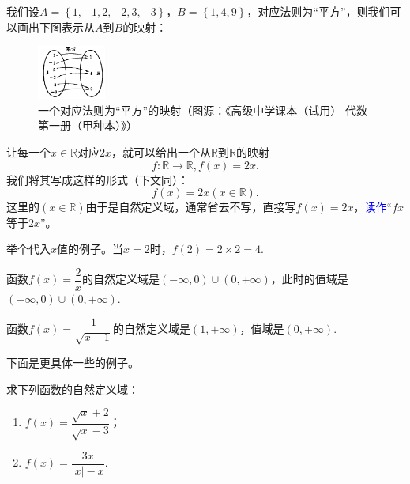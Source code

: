 \documentclass[lang=cn,math=cm,chinesefont=nofont,11pt,scheme=chinese,onecol]{elegantbook}
\begin{document}
\begin{example}
  我们设$A=\left\{1,-1,2,-2,3,-3\right\}$，$B=\left\{1,4,9\right\}$，对应法则为“平方”，则我们可以画出下图表示从$A$到$B$的映射：
\end{example}

\begin{figure}[h]
  \centering
  \includegraphics[width=0.2\textwidth]{image/map2.1.1.png}
  \caption{一个对应法则为“平方”的映射（图源：《高级中学课本（试用） 代数 第一册（甲种本）》）}
  \label{img:map1}
\end{figure}

\begin{example}\label{MapExample2}
  让每一个$x\in\mathbb{R}$对应$2x$，就可以给出一个从$\mathbb{R}$到$\mathbb{R}$的映射$$f:\mathbb{R}\rightarrow\mathbb{R},f(x)=2x.$$我们将其写成这样的形式（下文同）：$$f(x)=2x(x\in\mathbb{R}).$$这里的$(x\in\mathbb{R})$由于是自然定义域，通常省去不写，直接写$f(x)=2x$，\textcolor{blue}{读作}“$fx$等于$2x$”。

  举个代入$x$值的例子。当$x=2$时，$f(2)=2\times 2=4$.
\end{example}

\begin{spacing}{2.0}
  \begin{example}
    函数$f(x)=\dfrac{2}{x}$的自然定义域是$(-\infty,0)\cup(0,+\infty)$，此时的值域是$(-\infty,0)\cup(0,+\infty)$.
  \end{example}
  
  \begin{example}
    函数$f(x)=\dfrac{1}{\sqrt{x-1}}$的自然定义域是$(1,+\infty)$，值域是$(0,+\infty)$.
  \end{example}
  
  下面是更具体一些的例子。
  
  \begin{example}
    求下列函数的自然定义域：
  \end{example}
  
  \begin{enumerate}
    \item $f(x)=\dfrac{\sqrt{x}+2}{\sqrt{x}-3}$；
    \item $f(x)=\dfrac{3x}{\left| x \right|-x}$.
  \end{enumerate}
\end{spacing}
\end{document}
